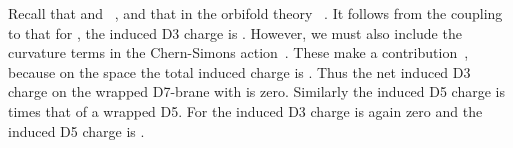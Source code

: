 \documentclass[a4paper,12pt]{article}
\renewcommand{\=}[1]{\bar{#1}}
\begin{document}
Recall that \coordHE{} and
\coordHE{}~\cite{bigbook}, and that in the orbifold
theory \coordHE{}~\cite{Aspin}.  It follows from the coupling to
\coordHE{} that for \coordHE{}, the induced D3 charge is \coordHE{}.
However, we must also include the curvature terms in the Chern-Simons
action~\cite{BSV}.  These make a contribution~\coordHE{}, because on the
space \coordHE{} the total induced charge is \coordHE{}.  Thus the net
induced D3 charge on the wrapped D7-brane with \coordHE{} is zero.
Similarly the
induced D5 charge is \coordHE{} times that of a wrapped D5.  For \myHighlight{$\Phi =
2\pi$}\coordHE{} the induced D3 charge is again zero and the induced D5 charge is
\coordHE{}.
\end{document}
